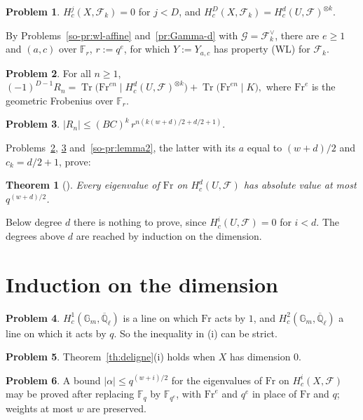 \documentclass[reqno]{amsart}
\theoremstyle{definition}
\newtheorem{problem}{Problem}[section]
\theoremstyle{plain}
\newtheorem{theorem}{Theorem}[section]
\newcommand{\Q}{\mathbb{Q}}
\newcommand{\F}{\mathbb{F}}
\newcommand{\G}{\mathbb{G}}
\newcommand{\Ql}{\overline{\Q}_\ell}
\newcommand{\cF}{\mathcal{F}}
\newcommand{\Fr}{\mathrm{Fr}}
\newcommand{\Tr}{\operatorname{Tr}}
\begin{document}
\begin{problem}\label{pr:kunneth-d}
\(H^j_c(X, \cF_k) = 0\) for \(j < D\), and \(H^D_c(X, \cF_k) = H^d_c(U, \cF)^{\otimes k}\).
\end{problem}

By Problems~\ref{so-pr:wl-affine} and~\ref{pr:Gamma-d} with \(\mathcal{G} = \cF_k^\vee\), there are \(e \ge 1\) and \((a, c)\) over \(\F_r\), \(r := q^e\), for which \(Y := Y_{a,c}\) has property (WL) for \(\cF_k\).

\begin{problem}\label{pr:prop4-d}
For all \(n \ge 1\),
\(
  (-1)^{D-1} R_n = \Tr\bigl(\Fr^{en} \mid H^d_c(U, \cF)^{\otimes k}\bigr) + \Tr\bigl(\Fr^{en} \mid K\bigr),
\)
where \(\Fr^e\) is the geometric Frobenius over \(\F_r\).
\end{problem}

\begin{problem}\label{pr:R-d}
\(\lvert R_n \rvert \le (BC)^k\, r^{n(k(w+d)/2 + d/2 + 1)}\).
\end{problem}

Problems~\ref{pr:prop4-d}, \ref{pr:R-d} and~\ref{so-pr:lemma2}, the latter with its \(a\) equal to \((w+d)/2\) and \(c_k = d/2 + 1\), prove:

\begin{theorem}[{\cite[Theorem~9]{Ald}}]\label{th:lowest}
Every eigenvalue of \(\Fr\) on \(H^d_c(U, \cF)\) has absolute value at most \(q^{(w+d)/2}\).
\end{theorem}

Below degree \(d\) there is nothing to prove, since \(H^i_c(U, \cF) = 0\) for \(i < d\).  The degrees above \(d\) are reached by induction on the dimension.

\section{Induction on the dimension}\label{sec:induction}

\begin{problem}\label{pr:gm}
\(H^1_c(\G_m, \Ql)\) is a line on which \(\Fr\) acts by \(1\), and \(H^2_c(\G_m, \Ql)\) a line on which it acts by \(q\).  So the inequality in (i) can be strict.
\end{problem}

\begin{problem}\label{pr:dim0}
Theorem~\ref{th:deligne}(i) holds when \(X\) has dimension \(0\).
\end{problem}

\begin{problem}\label{pr:extension}
A bound \(\lvert \alpha \rvert \le q^{(w+i)/2}\) for the eigenvalues of \(\Fr\) on \(H^i_c(X, \cF)\) may be proved after replacing \(\F_q\) by \(\F_{q^e}\), with \(\Fr^e\) and \(q^e\) in place of \(\Fr\) and \(q\); weights at most \(w\) are preserved.
\end{problem}
\end{document}

